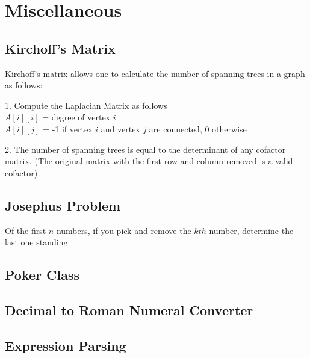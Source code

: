 
\chapter{Miscellaneous}
\chapterinfo{}
	\section{Kirchoff's Matrix}
	Kirchoff's matrix allows one to calculate the number of spanning trees in a 
	graph as follows:
	
	1. Compute the Laplacian Matrix as follows\\
	\indent\indent $A[i][i]$ = degree of vertex $i$\\
	\indent\indent $A[i][j]$ = -1 if vertex $i$ and vertex $j$ are connected, 0 otherwise
	
	2. The number of spanning trees is equal to the determinant of any cofactor 
	matrix. (The original matrix with the first row and column removed is a 
	valid cofactor)
	
	\section{Josephus Problem}
	
	Of the first $n$ numbers, if you pick and remove the $kth$ number, determine the last 
	one standing.
	
	
	
	\section{Poker Class}
	
	
    
	\section{Decimal to Roman Numeral Converter}
	
	

	\section{Expression Parsing}
	
	

